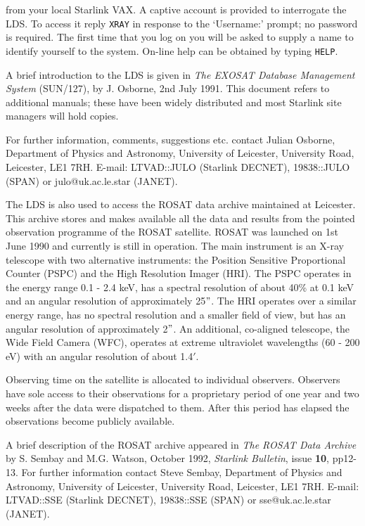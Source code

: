 \documentclass[twoside,11pt]{article}
\newcommand{\xref}[3]{#1}
\begin{document}
from your local Starlink VAX. A captive account is provided to 
interrogate the LDS. To access it reply \verb-XRAY- in response to the 
`Username:' prompt; no password is required. The first time that you log
on you will be asked to supply a name to identify yourself to the 
system. On-line help can be obtained by typing \verb-HELP-.

A brief introduction to the LDS is given in {\it The EXOSAT Database 
Management System} 
\newline
(\xref{SUN/127}{sun127}{}), by J. Osborne, 2nd July 1991. This document refers 
to additional manuals; these have been widely distributed and most 
Starlink site managers will hold copies.

For further information, comments, suggestions etc. contact Julian
Osborne, Department of Physics and Astronomy, University of Leicester, 
University Road, Leicester, LE1 7RH. E-mail: LTVAD::JULO (Starlink
DECNET), 19838::JULO (SPAN) or julo@uk.ac.le.star (JANET).

The LDS is also used to access the ROSAT data archive maintained at 
Leicester. This archive stores and makes available all the data and 
results from the pointed observation programme of the ROSAT satellite. 
ROSAT was launched on 1st June 1990 and currently is still in operation.
The main instrument is an X-ray telescope with two alternative 
instruments: the Position Sensitive Proportional Counter (PSPC) and the 
High Resolution Imager (HRI). The PSPC operates in the energy range 
0.1 - 2.4 keV, has a spectral resolution of about 40\% at 0.1 keV and an
angular resolution of approximately 25$"$. The HRI operates over a 
similar energy range, has no spectral resolution and a smaller field of 
view, but has an angular resolution of approximately 2$"$. An 
additional, co-aligned telescope, the Wide Field Camera (WFC), operates 
at extreme ultraviolet wavelengths (60 - 200 eV) with an angular 
resolution of about 1.4$'$.

Observing time on the satellite is allocated to individual observers.
Observers have sole access to their observations for a proprietary
period of one year and two weeks after the data were dispatched to them.
After this period has elapsed the observations become publicly 
available.

A brief description of the ROSAT archive appeared in {\it The ROSAT
Data Archive} by S. Sembay and M.G. Watson, October 1992, {\it 
Starlink Bulletin}, issue {\bf 10}, pp12-13. For further information
contact Steve Sembay, Department of Physics and Astronomy, University 
of Leicester, University Road, Leicester, LE1 7RH. E-mail: LTVAD::SSE
(Starlink DECNET), 19838::SSE (SPAN) or sse@uk.ac.le.star (JANET).
\end{document}
